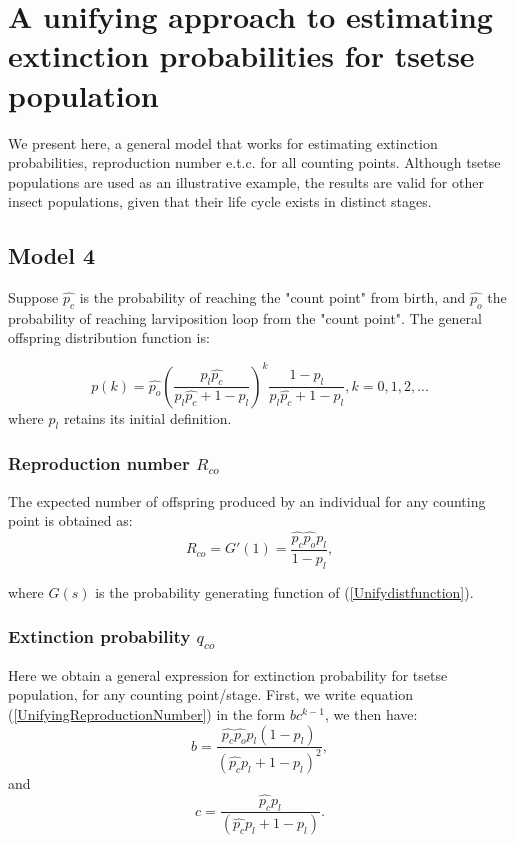 \section{\bf A unifying approach to estimating extinction probabilities for tsetse population}

We present here, a general model that works for estimating extinction probabilities, reproduction number e.t.c.   for all counting points. Although tsetse populations are used as an illustrative example, the results are valid for other insect populations, given that their life cycle exists in distinct stages. 


\subsection{\bf Model 4}
Suppose $\hat{p_c}$ is the probability of reaching the "count point" from birth, and $\hat{p_o}$ the
probability of reaching larviposition loop from the "count point". The general offspring distribution function is: 


\begin{equation}
\label{Unifydistfunction} 
p(k) = \hat{p_o}(\frac{p_{l}\hat{p_c}}{p_{l}\hat{p_c}+1-p_{l}})^{k}\frac{1-p_{l}}{p_{l}\hat{p_c}+1-p_{l}},  k =0,1,2,...
\end{equation} 
where $p_{l}$ retains its initial definition. 

\subsubsection{\bf Reproduction number $R_{co}$}
The expected number of offspring produced by an individual for any counting point is obtained as:  
\begin{equation}
\label{UnifyingReproductionNumber}
R_{co} = G'(1) = \frac{\hat{p_c}\hat{p_o}p_{l}}{1-p_{l}},
\end{equation}  

where $G(s)$ is the probability generating function of (\ref{Unifydistfunction}).

\subsubsection{\bf Extinction probability $q_{co}$}
Here we obtain a general expression for extinction probability for tsetse population, for any counting point/stage.  First,  we write equation (\ref{UnifyingReproductionNumber}) in the form $bc^{k-1}$, we then have:
$$ b = \frac{\hat{p_c}\hat{p_o}p_{l}(1-p_{l})}{(\hat{p_c}p_{l} + 1 - p_{l})^2}, $$
and 
$$ c = \frac{\hat{p_c}p_{l}}{(\hat{p_c}p_{l} + 1 - p_{l})}. $$


